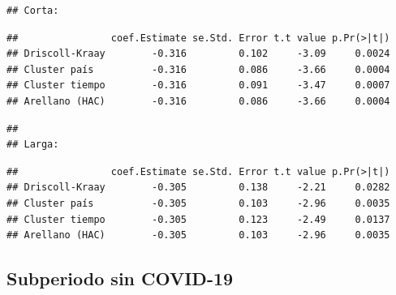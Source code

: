 \documentclass[
]{article}
\newenvironment{Shaded}{\begin{snugshade}}{\end{snugshade}}
\newcommand{\FunctionTok}[1]{\textcolor[rgb]{0.13,0.29,0.53}{\textbf{#1}}}
\newcommand{\NormalTok}[1]{#1}
\newcommand{\SpecialCharTok}[1]{\textcolor[rgb]{0.81,0.36,0.00}{\textbf{#1}}}
\newcommand{\StringTok}[1]{\textcolor[rgb]{0.31,0.60,0.02}{#1}}
\begin{document}
\begin{verbatim}
## Corta:
\end{verbatim}

\begin{verbatim}
##                coef.Estimate se.Std. Error t.t value p.Pr(>|t|)
## Driscoll-Kraay        -0.316         0.102     -3.09     0.0024
## Cluster país          -0.316         0.086     -3.66     0.0004
## Cluster tiempo        -0.316         0.091     -3.47     0.0007
## Arellano (HAC)        -0.316         0.086     -3.66     0.0004
\end{verbatim}

\begin{Shaded}
\end{Shaded}

\begin{verbatim}
## 
## Larga:
\end{verbatim}

\begin{verbatim}
##                coef.Estimate se.Std. Error t.t value p.Pr(>|t|)
## Driscoll-Kraay        -0.305         0.138     -2.21     0.0282
## Cluster país          -0.305         0.103     -2.96     0.0035
## Cluster tiempo        -0.305         0.123     -2.49     0.0137
## Arellano (HAC)        -0.305         0.103     -2.96     0.0035
\end{verbatim}

\subsection{Subperiodo sin COVID-19}\label{subperiodo-sin-covid-19}
\end{document}

